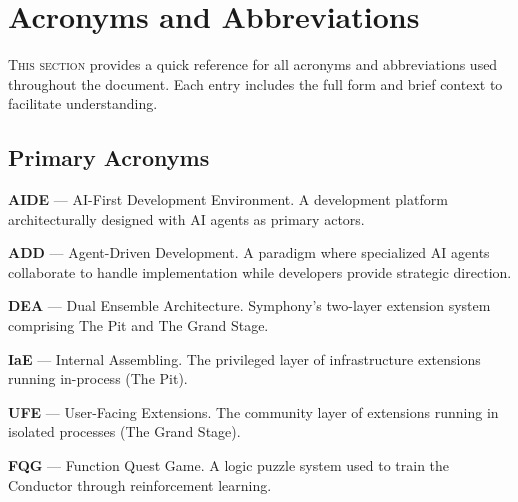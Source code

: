 
\section{Acronyms and Abbreviations}
\label{sec:acronyms}

\lettrine{T}{his section} provides a quick reference for all acronyms and abbreviations used throughout the document. Each entry includes the full form and brief context to facilitate understanding.

\subsection*{Primary Acronyms}

\vspace{0.3cm}

\noindent\textbf{AIDE} --- AI-First Development Environment. A development platform architecturally designed with AI agents as primary actors.

\vspace{0.2cm}

\noindent\textbf{ADD} --- Agent-Driven Development. A paradigm where specialized AI agents collaborate to handle implementation while developers provide strategic direction.

\vspace{0.2cm}

\noindent\textbf{DEA} --- Dual Ensemble Architecture. Symphony's two-layer extension system comprising The Pit and The Grand Stage.

\vspace{0.2cm}

\noindent\textbf{IaE} --- Internal Assembling. The privileged layer of infrastructure extensions running in-process (The Pit).

\vspace{0.2cm}

\noindent\textbf{UFE} --- User-Facing Extensions. The community layer of extensions running in isolated processes (The Grand Stage).

\vspace{0.2cm}

\noindent\textbf{FQG} --- Function Quest Game. A logic puzzle system used to train the Conductor through reinforcement learning.

\vspace{0.2cm}

